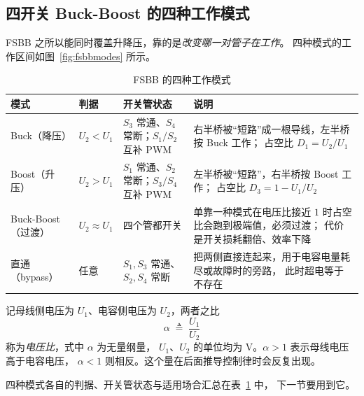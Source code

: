 \documentclass[cn,blue,11pt,device=normal]{elegantnote}
\begin{document}
\subsection{四开关 Buck-Boost 的四种工作模式}\label{sec:fsbbmode}

FSBB 之所以能同时覆盖升降压，靠的是\emph{改变哪一对管子在工作}。
四种模式的工作区间如图~\ref{fig:fsbbmodes} 所示。

\begin{table}[htbp]
  \centering
  \small
  \caption{FSBB 的四种工作模式}
  \label{tab:fsbbmodes}
  \begin{tabular}{@{}>{\raggedright\arraybackslash}p{}>{\raggedright\arraybackslash}p{}>{\raggedright\arraybackslash}p{}>{\raggedright\arraybackslash}p{}@{}}
    \toprule
    模式 & 判据 & 开关管状态 & 说明 \\
    \midrule
    Buck（降压） & $U_2<U_1$ &
    $S_3$ 常通、$S_4$ 常断；$S_1/S_2$ 互补 PWM &
    右半桥被“短路”成一根导线，左半桥按 Buck 工作；
    占空比 $D_1=U_2/U_1$ \\[4pt]
    Boost（升压） & $U_2>U_1$ &
    $S_1$ 常通、$S_2$ 常断；$S_3/S_4$ 互补 PWM &
    左半桥被“短路”，右半桥按 Boost 工作；
    占空比 $D_3=1-U_1/U_2$ \\[4pt]
    Buck-Boost（过渡） & $U_2\approx U_1$ &
    四个管都开关 &
    单靠一种模式在电压比接近 $1$ 时占空比会跑到极端值，必须过渡；
    代价是开关损耗翻倍、效率下降 \\[4pt]
    直通（bypass） & 任意 &
    $S_1,S_3$ 常通、$S_2,S_4$ 常断 &
    把两侧直接连起来，用于电容电量耗尽或故障时的旁路，
    此时超电等于不存在 \\
    \bottomrule
  \end{tabular}
\end{table}

记母线侧电压为 $U_1$、电容侧电压为 $U_2$，两者之比
\begin{equation}\label{eq:alphadef}
  \alpha \;\triangleq\; \frac{U_1}{U_2}
\end{equation}
称为\emph{电压比}，式中 $\alpha$ 为无量纲量，
$U_1$、$U_2$ 的单位均为 V。$\alpha>1$ 表示母线电压高于电容电压，
$\alpha<1$ 则相反。这个量在后面推导控制律时会反复出现。

四种模式各自的判据、开关管状态与适用场合汇总在表~\ref{tab:fsbbmodes} 中，
下一节要用到它。
\end{document}
